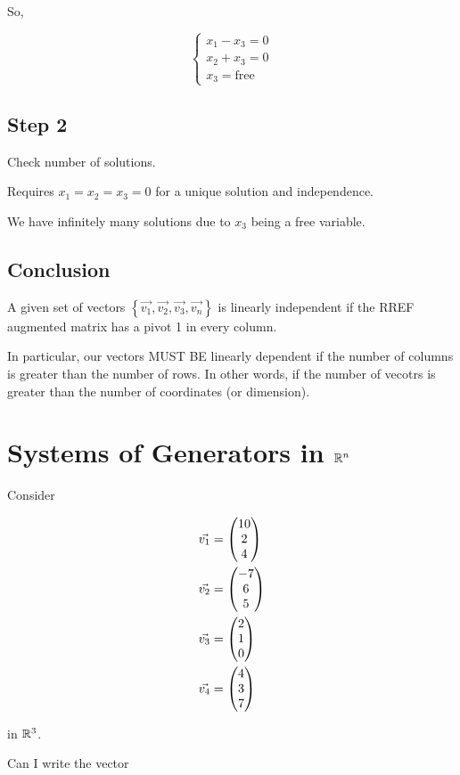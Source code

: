 \documentclass[a4paper]{article}
\begin{document}
So,

\[
	\begin{cases}
		x_1 - x_3 = 0 \\
		x_2 + x_3 = 0 \\
		x_3 = \text{free}
	\end{cases}
\]

\subsection{Step 2}
Check number of solutions.

Requires $x_1 = x_2 = x_3 = 0$ for a unique solution and independence.

We have infinitely many solutions due to $x_3$ being a free variable. 

\subsection{Conclusion}

A given set of vectors $\left\{ \vec{v_1}, \vec{v_2}, \vec{v_3}, \vec{v_n}\right\}$ is linearly independent if the RREF augmented matrix has a pivot 1 in every column.

In particular, our vectors MUST BE linearly dependent if the number of columns is greater than the number of rows. In other words, if the number of vecotrs is greater than the number of coordinates (or dimension).

\section{Systems of Generators in $\mathbb{R}^n$}

Consider 

\[
\begin{aligned}
	\vec{v_1} &=  \begin{pmatrix} 10\\2\\4 \end{pmatrix}  \\
	\vec{v_2} &=  \begin{pmatrix} -7\\6\\5 \end{pmatrix}  \\
	\vec{v_3} &=  \begin{pmatrix} 2\\1\\0 \end{pmatrix}  \\
	\vec{v_4} &=  \begin{pmatrix} 4\\3\\7 \end{pmatrix} 
\end{aligned}
\]

in $\mathbb{R}^3$.

Can I write the vector 
\end{document}
